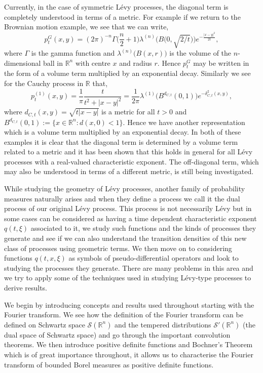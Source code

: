 \documentclass[a4paper, 12pt]{report}
\theoremstyle{remark}
\theoremstyle{definition}
\begin{document}
Currently, in the case of symmetric L\'evy processes, the diagonal term is completely understood in terms of a metric.  For example if we return to the Brownian motion example, we see that we can write,
$$
p_t^G(x, y) = (2\pi)^{-n}\Gamma\Big(\frac{n}{2} + 1\Big)\lambda^{(n)}\Big(B\big(0, \sqrt{2/t}\big)\Big)e^{-\frac{|x - y|^2}{2t}},
$$
where $\Gamma$ is the gamma function and $\lambda^{(n)}\big(B(x, r)\big)$ is the volume of the $n$-dimensional ball in $\mathbb{R}^n$ with centre $x$ and radius $r$.  Hence $p_t^G$ may be written in the form of a volume term multiplied by an exponential decay.  Similarly we see for the Cauchy process in $\mathbb{R}$ that,
$$
p_t^{(1)}(x, y) = \frac{1}{\pi}\frac{t}{t^2 + |x - y|^2} = \frac{1}{2\pi}\lambda^{(1)}\big(B^{d_{C, t}}(0, 1)\big)e^{-\delta_{C, t}^2(x, y)},
$$
where $d_{C, t}(x, y) = \sqrt{t|x - y|}$ is a metric for all $t > 0$ and $B^{d_{C, t}}(0, 1) := \{x \in \mathbb{R}^n : d(x, 0) < 1\}$.  Hence we have another representation which is a volume term multiplied by an exponential decay.  In both of these examples it is clear that the diagonal term is determined by a volume term related to a metric and it has been shown that this holds in general for all L\'evy processes with a real-valued characteristic exponent.  The off-diagonal term, which may also be understood in terms of a different metric, is still being investigated.  

While studying the geometry of L\'evy processes, another family of probability measures naturally arises and when they define a process we call it the dual process of our original L\'evy process.  This process is not necessarily L\'evy but in some cases can be considered as having a time dependent characteristic exponent $q(t, \xi)$ associated to it, we study such functions and the kinds of processes they generate and see if we can also understand the transition densities of this new class of processes using geometric terms.  We then move on to considering functions $q(t, x, \xi)$ as symbols of pseudo-differential operators and look to studying the processes they generate.  There are many problems in this area and we try to apply some of the techniques used in studying L\'evy-type processes to derive results.

We begin by introducing concepts and results used throughout starting with the Fourier transform.  We see how the definition of the Fourier transform can be defined on Schwartz space $\mathcal{S}(\mathbb{R}^n)$ and the tempered distributions $\mathcal{S}'(\mathbb{R}^n)$ (the dual space of Schwartz space) and go through the important convolution theorems.  We then introduce positive definite functions and Bochner's Theorem which is of great importance throughout, it allows us to characterise the Fourier transform of bounded Borel measures as positive definite functions.
\end{document}
